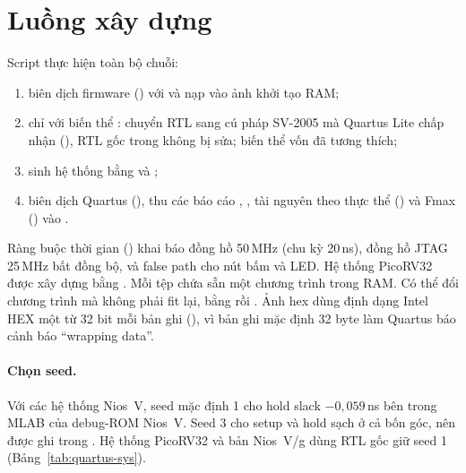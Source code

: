 \section{Luồng xây dựng}
Script  thực hiện toàn bộ chuỗi:
\begin{enumerate}
  \item biên dịch firmware () với  và nạp vào ảnh khởi tạo RAM;
  \item chỉ với biến thể : chuyển RTL sang cú pháp SV-2005 mà Quartus Lite chấp nhận (), RTL gốc trong  không bị sửa; biến thể  vốn đã tương thích;
  \item sinh hệ thống bằng  và ;
  \item biên dịch Quartus (), thu các báo cáo , , tài nguyên theo thực thể () và Fmax () vào .
\end{enumerate}
Ràng buộc thời gian () khai báo đồng hồ 50\,MHz (chu kỳ 20\,ns), đồng hồ JTAG 25\,MHz bất đồng bộ, và false path cho nút bấm và LED. Hệ thống PicoRV32 được xây dựng bằng . Mỗi tệp  chứa sẵn một chương trình trong RAM. Có thể đổi chương trình mà không phải fit lại, bằng  rồi . Ảnh hex dùng định dạng Intel HEX một từ 32 bit mỗi bản ghi (), vì bản ghi mặc định 32 byte làm Quartus báo cảnh báo ``wrapping data''.

\paragraph{Chọn seed.} Với các hệ thống Nios~V, seed mặc định 1 cho hold slack $-0{,}059$\,ns bên trong MLAB của debug-ROM Nios~V. Seed 3 cho setup và hold sạch ở cả bốn góc, nên được ghi trong . Hệ thống PicoRV32 và bản Nios~V/g dùng RTL gốc giữ seed 1 (Bảng~\ref{tab:quartus-sys}).

